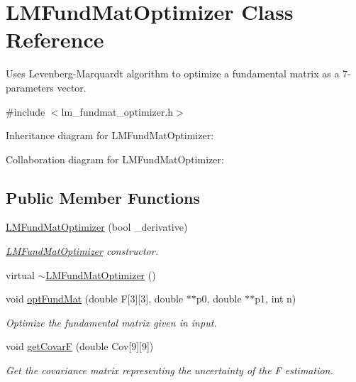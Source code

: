 \hypertarget{classLMFundMatOptimizer}{}\section{L\+M\+Fund\+Mat\+Optimizer Class Reference}
\label{classLMFundMatOptimizer}


Uses Levenberg-\/\+Marquardt algorithm to optimize a fundamental matrix as a 7-\/parameters vector.  




{\ttfamily \#include $<$lm\+\_\+fundmat\+\_\+optimizer.\+h$>$}



Inheritance diagram for L\+M\+Fund\+Mat\+Optimizer\+:


Collaboration diagram for L\+M\+Fund\+Mat\+Optimizer\+:
\subsection*{Public Member Functions}
\begin{DoxyCompactItemize}
\item 
\hyperlink{classLMFundMatOptimizer_a8b31fdaeadbd0ef891dd32e43047a2b7}{L\+M\+Fund\+Mat\+Optimizer} (bool \+\_\+derivative)
\begin{DoxyCompactList}\small\item\em \hyperlink{classLMFundMatOptimizer}{L\+M\+Fund\+Mat\+Optimizer} constructor. \end{DoxyCompactList}\item 
virtual \hyperlink{classLMFundMatOptimizer_a59b99d1cadfbc84109a6f9e6c3bfce71}{$\sim$\+L\+M\+Fund\+Mat\+Optimizer} ()
\item 
void \hyperlink{classLMFundMatOptimizer_a3e0094bab00c0ac0311d2cc1a5cadc38}{opt\+Fund\+Mat} (double F\mbox{[}3\mbox{]}\mbox{[}3\mbox{]}, double $\ast$$\ast$p0, double $\ast$$\ast$p1, int n)
\begin{DoxyCompactList}\small\item\em Optimize the fundamental matrix given in input. \end{DoxyCompactList}\item 
void \hyperlink{classLMFundMatOptimizer_a65104fdc336ff8f464229578b3b650b7}{get\+Covar\+F} (double Cov\mbox{[}9\mbox{]}\mbox{[}9\mbox{]})
\begin{DoxyCompactList}\small\item\em Get the covariance matrix representing the uncertainty of the F estimation. \end{DoxyCompactList}\end{DoxyCompactItemize}


